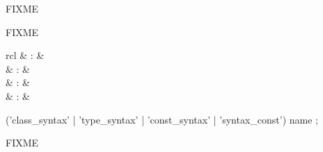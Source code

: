 \begin{isabellebody}
\begin{isamarkuptext}
  \begin{description}

  \item FIXME

  \end{description}%
\end{isamarkuptext}%
\isamarkuptrue%
%
\endisatagmlref
{\isafoldmlref}%
%
\isadelimmlref
%
\endisadelimmlref
%
\isamarkuptrue%
%
\begin{isamarkuptext}%
FIXME%
\end{isamarkuptext}%
\isamarkuptrue%
%
\isadelimmlantiq
%
\endisadelimmlantiq
%
\isatagmlantiq
%
\begin{isamarkuptext}%
\begin{matharray}{rcl}
  \hypertarget{ML antiquotation.class-syntax}{\hyperlink{ML antiquotation.class-syntax}{\mbox{}}} & : &  \\
  \hypertarget{ML antiquotation.type-syntax}{\hyperlink{ML antiquotation.type-syntax}{\mbox{}}} & : &  \\
  \hypertarget{ML antiquotation.const-syntax}{\hyperlink{ML antiquotation.const-syntax}{\mbox{}}} & : &  \\
  \hypertarget{ML antiquotation.syntax-const}{\hyperlink{ML antiquotation.syntax-const}{\mbox{}}} & : &  \\
  \end{matharray}

  \begin{rail}
  ('class_syntax' | 'type_syntax' | 'const_syntax' | 'syntax_const') name
  ;
  \end{rail}

  \begin{description}

  \item FIXME

  \end{description}%
\end{isamarkuptext}%
\isamarkuptrue%
%
\endisatagmlantiq
{\isafoldmlantiq}%
%
\isadelimmlantiq
%
\endisadelimmlantiq
%
\isadelimtheory
%
\endisadelimtheory
%
\isatagtheory
{}\isamarkupfalse%
%
\endisatagtheory
{\isafoldtheory}%
%
\isadelimtheory
%
\endisadelimtheory
\isanewline
\end{isabellebody}%
